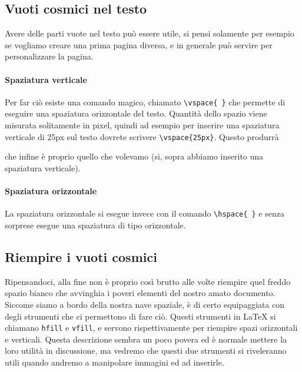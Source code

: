 \subsection{Vuoti cosmici nel testo}

Avere delle parti vuote nel testo può essere utile, si pensi solamente per
esempio se vogliamo creare una prima pagina diversa, e in generale può servire
per personalizzare la pagina.

\paragraph*{Spaziatura verticale} Per far ciò esiste una comando magico,
chiamato \verb!\vspace{ }! che permette di eseguire una spaziatura orizzontale
del testo. Quantità dello spazio viene misurata solitamente in pixel, quindi ad
esempio per inserire una spaziatura verticale di 25px sul testo dovrete
scrivere \verb!\vspace{25px}!. Questo produrrà

\vspace{25px}

\noindent che infine è proprio quello che volevamo (si, sopra abbiamo inserito
una spaziatura verticale).

\paragraph*{Spaziatura orizzontale} La spaziatura orizzontale si esegue invece
con il comando \verb!\hspace{ }! e senza sorprese esegue una spaziatura di tipo
orizzontale.

\subsection{Riempire i vuoti cosmici}

Ripensandoci, alla fine non è proprio così brutto alle volte riempire quel
freddo spazio bianco che avvinghia i poveri elementi del nostro amato
documento. Siccome siamo a bordo della nostra nave spaziale, è di certo
equipaggiata con degli strumenti che ci permettono di fare ciò. Questi
strumenti in \LaTeX{} si chiamano \texttt{hfill} e \texttt{vfill}, e servono
rispettivamente per riempire spazi orizzontali e verticali. Questa descrizione
sembra un poco povera ed è normale mettere la loro utilità in discussione, ma
vedremo che questi due strumenti si riveleranno utili quando andremo a
manipolare immagini ed ad inserirle.

